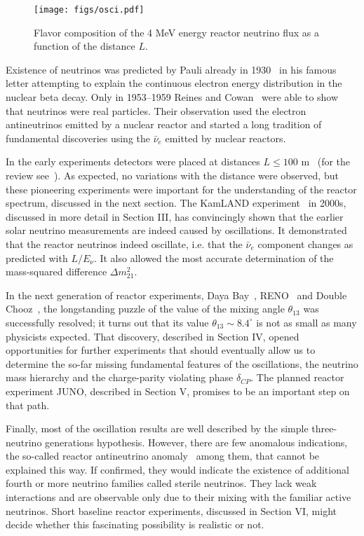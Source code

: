 \begin{figure}[htb]
\begin{centering}
\texttt{[image: figs/osci.pdf]}
\par\end{centering}
\caption{\label{fig:intro1} Flavor composition of the 4 MeV energy reactor neutrino flux as a function of the distance  $L$. }
\end{figure}

Existence of neutrinos was predicted by Pauli already in 1930~\cite{Pauli30} in his famous letter attempting to explain the continuous electron
energy distribution in the nuclear beta decay. Only in 1953--1959 Reines and Cowan~\cite{Reines53,Cowan56,Reines59} were able to show that neutrinos
were real particles. Their observation used the electron antineutrinos emitted by a nuclear reactor and started a long tradition of fundamental
discoveries using the $\bar{\nu}_e$ emitted by nuclear reactors.

In the early experiments detectors were placed at distances $L \le 100$ m~\cite{ILL,Gosgen,Rovno,Krasnoyarsk,SRP,Bugey4,Bugey3} (for the review see~\cite{Bemporad02}). As expected, no variations
with the distance were observed, but these pioneering experiments were important for the understanding of the reactor spectrum, discussed
in the next section. The KamLAND experiment~\cite{Kamland03,Kamland05,Kamland08} in 2000s, discussed in more detail in Section III, has convincingly shown that the earlier
solar neutrino measurements are indeed  caused by oscillations. It demonstrated that the reactor neutrinos indeed
oscillate, i.e. that the $\bar{\nu}_e$ component changes as predicted with $L/E_{\nu}$. It also allowed the most accurate determination of the 
mass-squared difference $\Delta m^2_{21}$.  

In the next generation of reactor experiments, Daya Bay~\cite{Dayabay,Dayabay14}, RENO~\cite{Reno}  and Double Chooz~\cite{DChooz,DChooz14}, the longstanding puzzle of the
value of the mixing angle $\theta_{13}$ was successfully resolved; it turns out that its value $\theta_{13} \sim 8.4^\circ$
is not as small as many physicists expected. That discovery, described in Section IV, opened opportunities for further experiments that should  
eventually allow us to determine the so-far missing fundamental features of the oscillations, the neutrino mass hierarchy and the charge-parity violating phase
$\delta_{CP}$. The planned reactor experiment JUNO, described in Section V,  promises to be an important step on that path.

Finally, most of the oscillation results are well described by the simple three-neutrino generations hypothesis. However, there are few anomalous indications,
the so-called reactor antineutrino anomaly~\cite{Mention} among them, that cannot be explained this way. If confirmed, they would indicate the existence of additional
fourth or more neutrino families called sterile neutrinos. They lack  weak interactions and are observable only due to their mixing with the familiar active neutrinos.  Short baseline
reactor experiments, discussed in Section VI, might decide whether this fascinating possibility is realistic or not.
